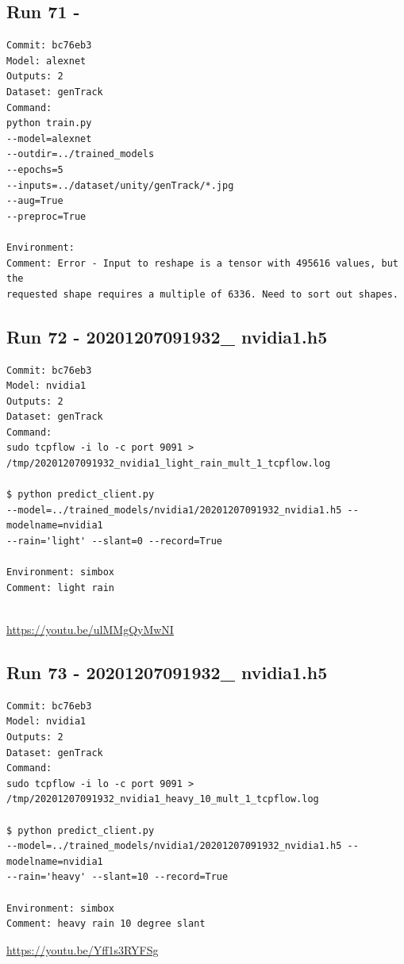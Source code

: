 \subsection{Run 71 - }
\begin{verbatim}
Commit: bc76eb3 
Model: alexnet
Outputs: 2 
Dataset: genTrack
Command:
python train.py
--model=alexnet
--outdir=../trained_models
--epochs=5
--inputs=../dataset/unity/genTrack/*.jpg
--aug=True
--preproc=True

Environment: 
Comment: Error - Input to reshape is a tensor with 495616 values, but the
requested shape requires a multiple of 6336. Need to sort out shapes.
\end{verbatim}

\subsection{Run 72 - 20201207091932\_ nvidia1.h5 }
\begin{verbatim}
Commit: bc76eb3 
Model: nvidia1
Outputs: 2
Dataset: genTrack
Command:
sudo tcpflow -i lo -c port 9091 >
/tmp/20201207091932_nvidia1_light_rain_mult_1_tcpflow.log

$ python predict_client.py
--model=../trained_models/nvidia1/20201207091932_nvidia1.h5 --modelname=nvidia1
--rain='light' --slant=0 --record=True

Environment: simbox
Comment: light rain


\end{verbatim}
\url{https://youtu.be/ulMMgQyMwNI}

\subsection{Run 73 - 20201207091932\_ nvidia1.h5}
\begin{verbatim}
Commit: bc76eb3 
Model: nvidia1
Outputs: 2
Dataset: genTrack
Command:
sudo tcpflow -i lo -c port 9091 >
/tmp/20201207091932_nvidia1_heavy_10_mult_1_tcpflow.log

$ python predict_client.py
--model=../trained_models/nvidia1/20201207091932_nvidia1.h5 --modelname=nvidia1
--rain='heavy' --slant=10 --record=True

Environment: simbox
Comment: heavy rain 10 degree slant
\end{verbatim}
\url{https://youtu.be/Yff1s3RYFSg}

